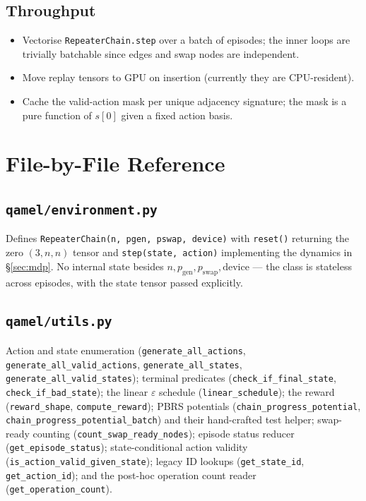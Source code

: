 \documentclass[11pt]{article}
\newcommand{\code}[1]{\texttt{#1}}
\newcommand{\file}[1]{\texttt{\small #1}}
\newcommand{\pgen}{p_{\text{gen}}}
\newcommand{\pswap}{p_{\text{swap}}}
\begin{document}
\subsection{Throughput}
\begin{itemize}
  \item Vectorise \code{RepeaterChain.step} over a batch of episodes; the inner loops are trivially batchable since edges and swap nodes are independent.
  \item Move replay tensors to GPU on insertion (currently they are CPU-resident).
  \item Cache the valid-action mask per unique adjacency signature; the mask is a pure function of $s[0]$ given a fixed action basis.
\end{itemize}

\section{File-by-File Reference}
\label{sec:filebyfile}

\subsection{\file{qamel/environment.py}}
Defines \code{RepeaterChain(n, pgen, pswap, device)} with \code{reset()} returning the zero $(3,n,n)$ tensor and \code{step(state, action)} implementing the dynamics in \S\ref{sec:mdp}. No internal state besides $n,\pgen,\pswap,\text{device}$ --- the class is stateless across episodes, with the state tensor passed explicitly.

\subsection{\file{qamel/utils.py}}
Action and state enumeration (\code{generate\_all\_actions}, \code{generate\_all\_valid\_actions}, \code{generate\_all\_states}, \code{generate\_all\_valid\_states}); terminal predicates (\code{check\_if\_final\_state}, \code{check\_if\_bad\_state}); the linear $\varepsilon$ schedule (\code{linear\_schedule}); the reward (\code{reward\_shape}, \code{compute\_reward}); PBRS potentials (\code{chain\_progress\_potential}, \code{chain\_progress\_potential\_batch}) and their hand-crafted test helper; swap-ready counting (\code{count\_swap\_ready\_nodes}); episode status reducer (\code{get\_episode\_status}); state-conditional action validity (\code{is\_action\_valid\_given\_state}); legacy ID lookups (\code{get\_state\_id}, \code{get\_action\_id}); and the post-hoc operation count reader (\code{get\_operation\_count}).
\end{document}
